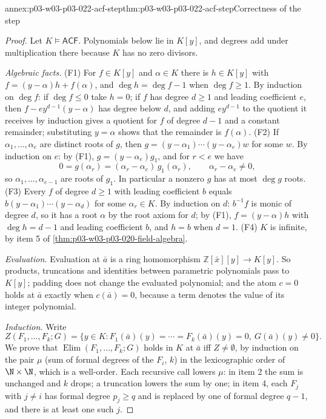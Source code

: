 \begin{annexitem}{annex:p03-w03-p03-022-acf-step}{thm:p03-w03-p03-022-acf-step}{Correctness of the step}
\begin{proof}
Let \(K\models\mathsf{ACF}\). Polynomials below lie in \(K[y]\), and
degrees add under multiplication there because \(K\) has no zero divisors.

\emph{Algebraic facts.} (F1) For \(f\in K[y]\) and \(\alpha\in K\) there is
\(h\in K[y]\) with \(f=(y-\alpha)h+f(\alpha)\), and \(\deg h=\deg f-1\) when
\(\deg f\ge1\). By induction on \(\deg f\): if \(\deg f\le0\) take \(h=0\);
if \(f\) has degree \(d\ge1\) and leading coefficient \(e\), then
\(f-ey^{d-1}(y-\alpha)\) has degree below \(d\), and adding
\(ey^{d-1}\) to the quotient it receives by induction gives a quotient for
\(f\) of degree \(d-1\) and a constant remainder; substituting
\(y=\alpha\) shows that the remainder is \(f(\alpha)\).
(F2) If \(\alpha_1,\ldots,\alpha_e\) are distinct roots of \(g\), then
\(g=(y-\alpha_1)\cdots(y-\alpha_e)w\) for some \(w\). By induction on
\(e\): by (F1), \(g=(y-\alpha_e)g_1\), and for \(r<e\) we have
\[
0=g(\alpha_r)=(\alpha_r-\alpha_e)\,g_1(\alpha_r),\qquad
\alpha_r-\alpha_e\ne0,
\]
so \(\alpha_1,\ldots,\alpha_{e-1}\) are roots of
\(g_1\). In particular a nonzero \(g\) has at most \(\deg g\) roots.
(F3) Every \(f\) of degree \(d\ge1\) with leading coefficient \(b\) equals
\(b(y-\alpha_1)\cdots(y-\alpha_d)\) for some \(\alpha_r\in K\). By induction
on \(d\): \(b^{-1}f\) is monic of degree \(d\), so it has a root \(\alpha\)
by the root axiom for \(d\); by (F1), \(f=(y-\alpha)h\) with \(\deg h=d-1\)
and leading coefficient \(b\), and \(h=b\) when \(d=1\).
(F4) \(K\) is infinite, by item 5 of \cref{thm:p03-w03-p03-020-field-algebra}.

\emph{Evaluation.} Evaluation at \(\bar a\) is a ring homomorphism
\(\mathbb Z[\bar x][y]\to K[y]\). So products, truncations and identities
between parametric polynomials pass to \(K[y]\); padding does not change
the evaluated polynomial; and the atom \(c=0\) holds at \(\bar a\) exactly
when \(c(\bar a)=0\), because a term denotes the value of its integer
polynomial.

\emph{Induction.} Write
\[
Z(F_1,\ldots,F_k;G)=\{y\in K:F_1(\bar a)(y)=\cdots=F_k(\bar a)(y)=0,\
G(\bar a)(y)\ne0\}.
\]
We prove that \(\operatorname{Elim}(F_1,\ldots,F_k;G)\) holds in \(K\) at
\(\bar a\) iff \(Z\ne\emptyset\), by induction on the pair \(\mu\) (sum of formal degrees
of the \(F_i\), \(k\)) in the lexicographic order of \(\N\times\N\), which is a
well-order. Each recursive call lowers \(\mu\): in item 2 the sum is
unchanged and \(k\) drops; a truncation lowers the sum by one; in item 4,
each \(F_j\) with \(j\ne i\) has formal degree \(p_j\ge q\) and is replaced by
one of formal degree \(q-1\), and there is at least one such \(j\).


\end{proof}
\end{annexitem}

